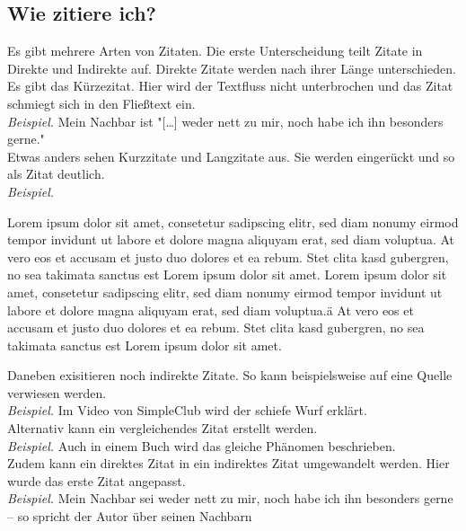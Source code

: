 \subsection{Wie zitiere ich?}
    Es gibt mehrere Arten von Zitaten. Die erste Unterscheidung teilt Zitate in Direkte und Indirekte auf.
    Direkte Zitate werden nach ihrer Länge unterschieden. Es gibt das Kürzezitat. Hier wird der Textfluss nicht unterbrochen und das Zitat schmiegt sich in den Fließtext ein.\\
    \emph{Beispiel.} Mein Nachbar ist "[\dots] weder nett zu mir, noch habe ich ihn besonders gerne." \autocite[][S. 69]{ruprecht}\\
    Etwas anders sehen Kurzzitate und Langzitate aus. Sie werden eingerückt und so als Zitat deutlich.\\
    \emph{Beispiel.}\\
    \begin{displayquote}
        Lorem ipsum dolor sit amet, consetetur sadipscing elitr, sed diam nonumy eirmod tempor invidunt ut labore et dolore magna aliquyam erat, sed diam voluptua.
        At vero eos et accusam et justo duo dolores et ea rebum.
        Stet clita kasd gubergren, no sea takimata sanctus est Lorem ipsum dolor sit amet.
        Lorem ipsum dolor sit amet, consetetur sadipscing elitr, sed diam nonumy eirmod tempor invidunt ut labore et dolore magna aliquyam erat, sed diam voluptua.ä
        At vero eos et accusam et justo duo dolores et ea rebum. Stet clita kasd gubergren, no sea takimata sanctus est Lorem ipsum dolor sit amet. \autocite[S. 11f.]{simpleclub}
    \end{displayquote}
    Daneben exisitieren noch indirekte Zitate. So kann beispielsweise auf eine Quelle verwiesen werden.\\
    \emph{Beispiel.} Im Video von SimpleClub \autocite{simpleclub} wird der schiefe Wurf erklärt.\\
    Alternativ kann ein vergleichendes Zitat erstellt werden.\\
    \emph{Beispiel.} Auch in einem Buch wird das gleiche Phänomen beschrieben. \autocite[vgl.][]{ruprecht}\\
    Zudem kann ein direktes Zitat in ein indirektes Zitat umgewandelt werden. Hier wurde das erste Zitat angepasst.\\
    \emph{Beispiel.} Mein Nachbar sei weder nett zu mir, noch habe ich ihn besonders gerne -- so spricht der Autor über seinen Nachbarn \autocite[vgl.][S. 69]{ruprecht}\\
    \\
